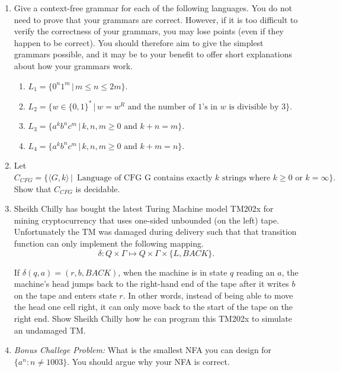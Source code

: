 \documentclass[11pt]{article}
\begin{document}
\begin{enumerate}
\item Give a context-free grammar for each of the following languages. You do not need to prove that your grammars are correct. However, if it is too difficult to verify the correctness of your grammars, you may lose points (even if they happen to be correct). You should therefore aim to give the simplest grammars possible, and it may be to your benefit to offer short explanations about how your grammars work.

\begin{enumerate}
\item $L_1 = \{0^n1^m  \, | \, m \leq n \leq 2m\}$.
\item $L_2 = \{w \in \{0,1\}^* \, | \, w = w^R \textrm{ and the number of $1$'s in $w$ is divisible by $3$}\}$.
\item $L_3 = \{a^k b^n c^m \, | \, k,n,m \geq 0 \textrm{ and } k+n=m\}$.
\item $L_4 = \{a^k b^n c^m \, | \, k,n,m \geq 0 \textrm{ and } k+m=n\}$.
\end{enumerate}

\item Let $C_{CFG} = \{\langle G,k \rangle \, | \, \textrm{ Language of CFG G contains exactly $k$ strings where $k\geq 0$ or $k=\infty$} \}.$ Show that $C_{CFG}$ is decidable.

\item Sheikh Chilly has bought the latest Turing Machine model TM202x for mining cryptocurrency that uses one-sided unbounded (on the left) tape. Unfortunately the TM was damaged during delivery such that that transition function can only implement the following mapping. 
\begin{equation*}
\delta : Q \times \Gamma \mapsto Q \times \Gamma \times \{L, BACK \}.
\end{equation*}

If $\delta(q, a) = (r, b,BACK)$, when the machine is in state $q$ reading an $a$, the machine's head jumps back to the right-hand end of the tape after it writes $b$ on the tape and enters state $r$. In other words, instead of being able to move the head one cell right, it can only move back to the start of the tape on the right end. Show Sheikh Chilly how he can program this TM202x to simulate an undamaged TM. 

\item \emph{Bonus Challege Problem:} What is the smallest NFA you can design for $\{a^n : n \neq 1003\}$. You should argue why your NFA is correct.
\end{enumerate}
\end{document}

